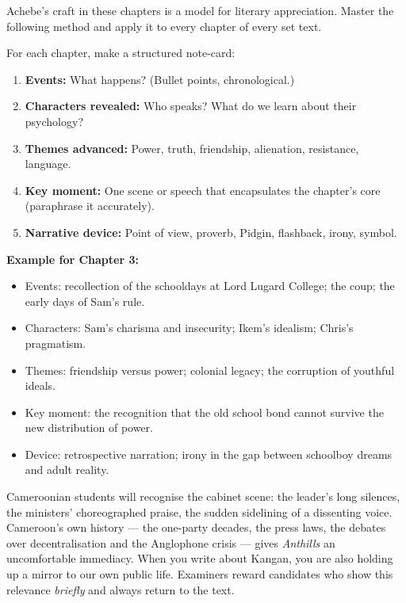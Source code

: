 \documentclass[11pt]{article}
\newcommand{\cle}[1]{{\popxbold\color{popdark}#1}}
\begin{document}
Achebe’s craft in these chapters is a model for \cle{literary appreciation}. Master the following method and apply it to every chapter of every set text.

\begin{methode}
For each chapter, make a structured note-card:
\begin{enumerate}
\item \textbf{Events:} What happens? (Bullet points, chronological.)
\item \textbf{Characters revealed:} Who speaks? What do we learn about their psychology?
\item \textbf{Themes advanced:} Power, truth, friendship, alienation, resistance, language.
\item \textbf{Key moment:} One scene or speech that encapsulates the chapter’s core (paraphrase it accurately).
\item \textbf{Narrative device:} Point of view, proverb, Pidgin, flashback, irony, symbol.
\end{enumerate}
\textbf{Example for Chapter 3:}
\begin{itemize}
\item Events: recollection of the schooldays at Lord Lugard College; the coup; the early days of Sam’s rule.
\item Characters: Sam’s charisma and insecurity; Ikem’s idealism; Chris’s pragmatism.
\item Themes: friendship versus power; colonial legacy; the corruption of youthful ideals.
\item Key moment: the recognition that the old school bond cannot survive the new distribution of power.
\item Device: retrospective narration; irony in the gap between schoolboy dreams and adult reality.
\end{itemize}
\end{methode}

\begin{savaistu}
Cameroonian students will recognise the cabinet scene: the leader’s long silences, the ministers’ choreographed praise, the sudden sidelining of a dissenting voice. Cameroon’s own history — the one-party decades, the press laws, the debates over decentralisation and the Anglophone crisis — gives \emph{Anthills} an uncomfortable immediacy. When you write about Kangan, you are also holding up a mirror to our own public life. Examiners reward candidates who show this relevance \emph{briefly} and always return to the text.
\end{savaistu}
\end{document}
